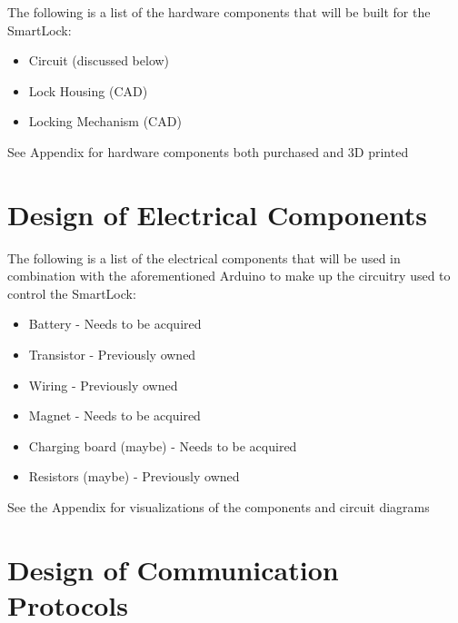 \documentclass[12pt, titlepage]{article}
\begin{document}
The following is a list of the hardware components that will be built for the SmartLock:
\begin{itemize}
\item Circuit (discussed below)
\item Lock Housing (CAD)
\item Locking Mechanism (CAD)
\end{itemize}

See Appendix for hardware components both purchased and 3D printed


\section{Design of Electrical Components}

The following is a list of the electrical components that will be used in combination with the aforementioned Arduino to make up the circuitry used to control the SmartLock:
\begin{itemize}
\item Battery
\subitem - Needs to be acquired
\item Transistor
\subitem - Previously owned
\item Wiring
\subitem - Previously owned
\item Magnet
\subitem - Needs to be acquired
\item Charging board (maybe)
\subitem - Needs to be acquired
\item Resistors (maybe)
\subitem - Previously owned
\end{itemize}

See the Appendix for visualizations of the components and circuit diagrams


\section{Design of Communication Protocols}
\end{document}
